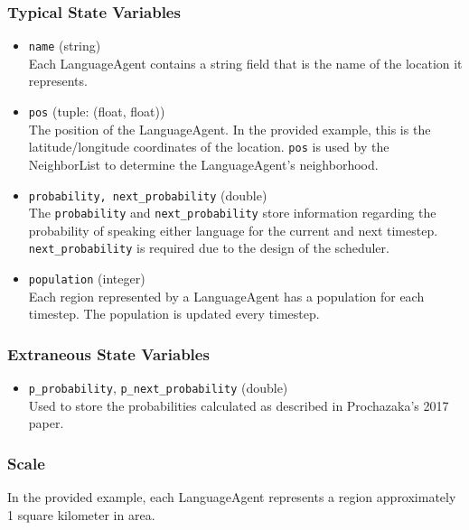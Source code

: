 \documentclass{article}
\begin{document}
\subsubsection{Typical State Variables}
\begin{itemize}
	\item \texttt{name} (string)\\
	      Each LanguageAgent contains a string field that is the name of the location it represents.
	      
	\item \texttt{pos} (tuple: (float, float)) \\
	      The position of the LanguageAgent. In the provided example, this is the latitude/longitude coordinates of the location. \texttt{pos} is used by the NeighborList to determine the LanguageAgent's neighborhood.
	      
	\item \texttt{probability, next\_probability} (double) \\
	      The \texttt{probability} and \texttt{next\_probability} store information regarding the probability of speaking either language for the current and next timestep. \texttt{next\_probability} is required due to the design of the scheduler.
	      
	\item \texttt{population} (integer) \\
	      Each region represented by a LanguageAgent has a population for each timestep. The population is updated every timestep.
	      
\end{itemize}

\subsubsection{Extraneous State Variables}
\begin{itemize}
	\item \texttt{p\_probability}, \texttt{p\_next\_probability} (double) \\
	      Used to store the probabilities calculated as described in Prochazaka's 2017 paper.
	      
\end{itemize}

\subsubsection{Scale}

In the provided example, each LanguageAgent represents a region approximately 1 square kilometer in area.
\end{document}
